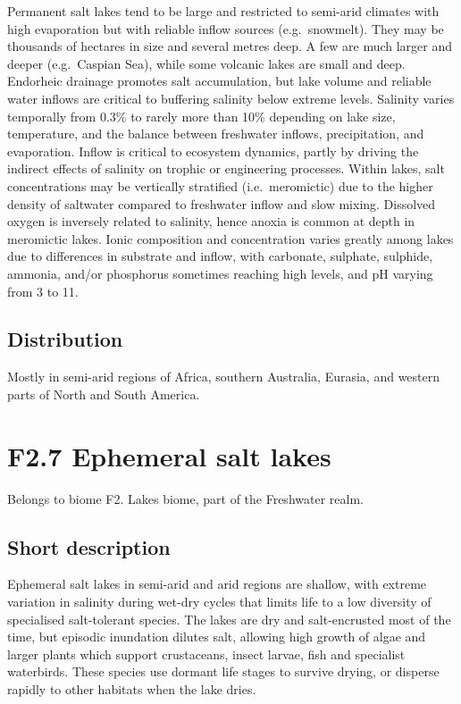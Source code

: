 \documentclass[
  letterpaper,
  DIV=11,
  numbers=noendperiod]{scrartcl}
\begin{document}
Permanent salt lakes tend to be large and restricted to semi-arid
climates with high evaporation but with reliable inflow sources
(e.g.~snowmelt). They may be thousands of hectares in size and several
metres deep. A few are much larger and deeper (e.g.~Caspian Sea), while
some volcanic lakes are small and deep. Endorheic drainage promotes salt
accumulation, but lake volume and reliable water inflows are critical to
buffering salinity below extreme levels. Salinity varies temporally from
0.3\% to rarely more than 10\% depending on lake size, temperature, and
the balance between freshwater inflows, precipitation, and evaporation.
Inflow is critical to ecosystem dynamics, partly by driving the indirect
effects of salinity on trophic or engineering processes. Within lakes,
salt concentrations may be vertically stratified (i.e.~meromictic) due
to the higher density of saltwater compared to freshwater inflow and
slow mixing. Dissolved oxygen is inversely related to salinity, hence
anoxia is common at depth in meromictic lakes. Ionic composition and
concentration varies greatly among lakes due to differences in substrate
and inflow, with carbonate, sulphate, sulphide, ammonia, and/or
phosphorus sometimes reaching high levels, and pH varying from 3 to 11.

\subsection{Distribution}\label{distribution-122}

Mostly in semi-arid regions of Africa, southern Australia, Eurasia, and
western parts of North and South America.

\section{F2.7 Ephemeral salt lakes}\label{f2.7-ephemeral-salt-lakes-1}

Belongs to biome F2. Lakes biome, part of the Freshwater realm.

\subsection{Short description}\label{short-description-123}

Ephemeral salt lakes in semi-arid and arid regions are shallow, with
extreme variation in salinity during wet-dry cycles that limits life to
a low diversity of specialised salt-tolerant species. The lakes are dry
and salt-encrusted most of the time, but episodic inundation dilutes
salt, allowing high growth of algae and larger plants which support
crustaceans, insect larvae, fish and specialist waterbirds. These
species use dormant life stages to survive drying, or disperse rapidly
to other habitats when the lake dries.
\end{document}
